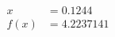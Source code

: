 \documentclass[preview]{standalone}
\begin{document}
\begin{align*}
x &= 0.1244\\f(x) &= 4.2237141
\end{align*}
\end{document}
